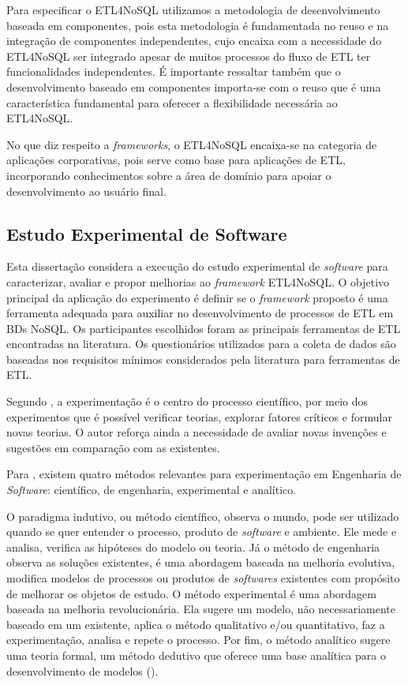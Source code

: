 Para especificar o ETL4NoSQL utilizamos a metodologia de desenvolvimento baseada em componentes, pois esta metodologia é fundamentada no reuso e na integração de componentes independentes, cujo encaixa com a necessidade do ETL4NoSQL ser integrado apesar de muitos processos do fluxo de ETL ter funcionalidades independentes. É importante ressaltar também que o desenvolvimento baseado em componentes importa-se com o reuso que é uma característica fundamental para oferecer a flexibilidade necessária ao ETL4NoSQL.

No que diz respeito a \textit{frameworks}, o ETL4NoSQL encaixa-se na categoria de aplicações corporativas, pois serve como base para aplicações de ETL, incorporando conhecimentos sobre a área de domínio para apoiar o desenvolvimento ao usuário final.




\subsection{Estudo Experimental de Software}

Esta dissertação considera a execução do estudo experimental de \textit{software} para caracterizar, avaliar e propor melhorias ao \textit{framework} ETL4NoSQL. O objetivo principal da aplicação do experimento é definir se o \textit{framework} proposto é uma ferramenta adequada para auxiliar no desenvolvimento de processos de ETL em BDs NoSQL. Os participantes escolhidos foram as principais ferramentas de ETL encontradas na literatura. Os questionários utilizados para a coleta de dados são baseadas nos requisitos mínimos considerados pela literatura para ferramentas de ETL.

Segundo \cite{travassos:2002}, a experimentação é o centro do processo científico, por meio dos experimentos que é possível verificar teorias, explorar fatores críticos e formular novas teorias. O autor reforça ainda a necessidade de avaliar novas invenções e sugestões em comparação com as existentes.

Para \cite{wohlin:2000}, existem quatro métodos relevantes para experimentação em Engenharia de \textit{Software}: científico, de engenharia, experimental e analítico. 

O paradigma indutivo, ou método científico, observa o mundo, pode ser utilizado quando se quer entender o processo, produto de \textit{software} e ambiente. Ele mede e analisa, verifica as hipóteses do modelo ou teoria.  Já o método de engenharia observa as soluções existentes, é uma abordagem baseada na melhoria evolutiva, modifica modelos de processos ou produtos de \textit{softwares} existentes com propósito de melhorar os objetos de estudo. O método experimental é uma abordagem baseada na melhoria revolucionária. Ela sugere um modelo, não necessariamente baseado em um existente, aplica o método qualitativo e/ou quantitativo, faz a experimentação, analisa e repete o processo. Por fim, o método analítico sugere uma teoria formal, um método dedutivo que oferece uma base analítica para o desenvolvimento de modelos (\cite{travassos:2002}).


